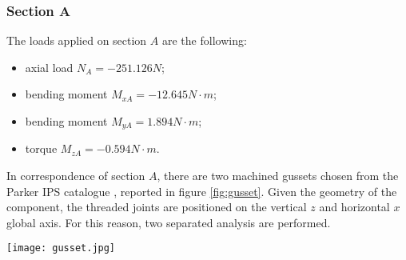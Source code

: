 \subsubsection*{Section A}
The loads applied on section $A$ are the following:\\
\begin{itemize}
	\item axial load $N_{A} = -251.126 N$;
	\item bending moment $M_{xA} = -12.645 N\cdot m$; 
	\item bending moment $M_{yA} = 1.894 N\cdot m$; 
	\item torque $M_{zA} = -0.594 N\cdot m$.
\end{itemize}
In correspondence of section $A$, there are two machined gussets chosen from the Parker IPS catalogue \cite{parker-ds}, reported in figure \ref{fig:gusset}.
Given the geometry of the component, the threaded joints are positioned on the vertical $z$ and horizontal $x$ global axis.  For this reason, two separated analysis are performed. 
\begin{SCfigure}[1.5][bht]
	\centering
	\texttt{[image: gusset.jpg]}
	\caption{machined gusset, code \texttt{10-102}, from the IPS catalogue \cite{parker-ds}. In the drawing: $A = 77mm$, $B=77mm$, $C = 34mm$, $D= 20mm$, $E=40mm$, $F=8mm$, $G=9mm$.}
	\label{fig:gusset}
\end{SCfigure}

